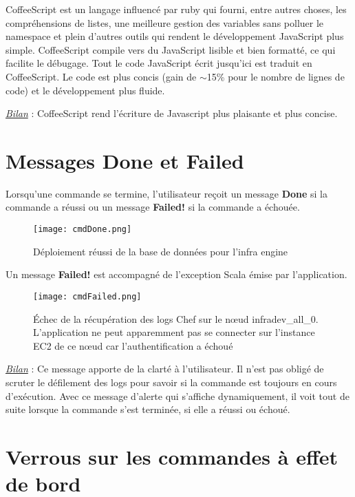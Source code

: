 CoffeeScript est un langage influencé par ruby qui fourni, entre autres choses,
les compréhensions de listes, une meilleure gestion des variables sans polluer
le namespace et plein d'autres outils qui rendent le développement JavaScript
plus simple. CoffeeScript compile vers du JavaScript lisible et bien formatté,
ce qui facilite le débugage.
Tout le code JavaScript écrit jusqu'ici est traduit en CoffeeScript.
Le code est plus concis (gain de $\sim$15\% pour le nombre de lignes de code) et le
développement plus fluide.

\underline{\textit{Bilan}} : CoffeeScript rend l'écriture de Javascript plus
plaisante et plus concise.

\section{Messages Done et Failed}

Lorsqu'une commande se termine, l'utilisateur reçoit un message \textbf{Done} si la
commande a réussi ou un message \textbf{Failed!} si la commande a échouée.

\begin{figure}[H]
  \texttt{[image: cmdDone.png]}
  \caption{Déploiement réussi de la base de données pour l'infra engine}
\end{figure}

Un message \textbf{Failed!} est accompagné de l'exception Scala émise par
l'application.

\begin{figure}[H]
  \texttt{[image: cmdFailed.png]}
  \caption{Échec de la récupération des logs Chef sur le nœud infradev\_all\_0.\\
    L'application ne peut apparemment pas se connecter sur l'instance EC2 de
    ce nœud car l'authentification a échoué}
\end{figure}

\underline{\textit{Bilan}} : Ce message apporte de la clarté à l'utilisateur.
Il n'est pas obligé de scruter le défilement des logs pour savoir si la commande
est toujours en cours d'exécution. Avec ce message d'alerte qui s'affiche
dynamiquement, il voit tout de suite lorsque la commande s'est terminée, si elle
a réussi ou échoué.

\section{Verrous sur les commandes à effet de bord}

